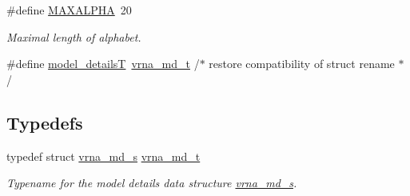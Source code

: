 \begin{DoxyCompactItemize}
\#define \mbox{\hyperlink{group__model__details_ga05a5ffe718aa431d97419a12fb082379}{M\+A\+X\+A\+L\+P\+HA}}~20
\begin{DoxyCompactList}\small\item\em Maximal length of alphabet. \end{DoxyCompactList}\item 
\#define \mbox{\hyperlink{group__model__details_ga590b5539f4560d5b02e24db8d3ed1977}{model\+\_\+detailsT}}~\mbox{\hyperlink{group__model__details_ga1f8a10e12a0a1915f2a4eff0b28ea17c}{vrna\+\_\+md\+\_\+t}}               /$\ast$ restore compatibility of struct rename $\ast$/
\end{DoxyCompactItemize}
\subsection*{Typedefs}
\begin{DoxyCompactItemize}
\item 
typedef struct \mbox{\hyperlink{group__model__details_structvrna__md__s}{vrna\+\_\+md\+\_\+s}} \mbox{\hyperlink{group__model__details_ga1f8a10e12a0a1915f2a4eff0b28ea17c}{vrna\+\_\+md\+\_\+t}}
\begin{DoxyCompactList}\small\item\em Typename for the model details data structure \mbox{\hyperlink{group__model__details_structvrna__md__s}{vrna\+\_\+md\+\_\+s}}. \end{DoxyCompactList}\end{DoxyCompactItemize}
